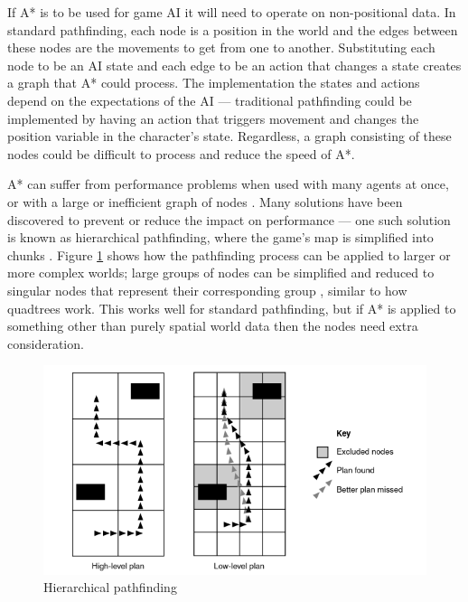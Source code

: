 \documentclass[11pt, a4paper]{report}
\begin{document}
If A* is to be used for game AI it will need to operate on non-positional data. In standard pathfinding, each node is a position in the world and the edges between these nodes are the movements to get from one to another. Substituting each node to be an AI state and each edge to be an action that changes a state creates a graph that A* could process. The implementation the states and actions depend on the expectations of the AI --- traditional pathfinding could be implemented by having an action that triggers movement and changes the position variable in the character's state. Regardless, a graph consisting of these nodes could be difficult to process and reduce the speed of A*.

A* can suffer from performance problems when used with many agents at once, or with a large or inefficient graph of nodes \parencite{graham2003pathfinding}. Many solutions have been discovered to prevent or reduce the impact on performance --- one such solution is known as hierarchical pathfinding, where the game's map is simplified into chunks \parencite[126]{cui2011based}. Figure \ref{fig:hierarchicalPathfinding} shows how the pathfinding process can be applied to larger or more complex worlds; large groups of nodes can be simplified and reduced to singular nodes that represent their corresponding group \parencite{botea2004near}, similar to how quadtrees work. This works well for standard pathfinding, but if A* is applied to something other than purely spatial world data then the nodes need extra consideration. 

\begin{figure}[!h]
  \centering
  \includegraphics[width=\linewidth]{img/hierarchical_pathfinding.png}
  \caption{Hierarchical pathfinding \parencite[263]{millington2019ai}}
  \label{fig:hierarchicalPathfinding}
\end{figure}
\end{document}
